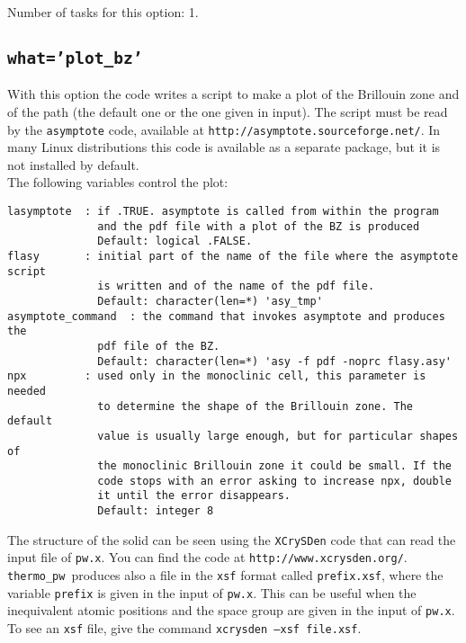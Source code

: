 \documentclass[12pt,a4paper]{article}
\def\thermo{\texttt{thermo\_pw}}
\begin{document}
Number of tasks for this option: 1.

\subsection{\color{web-blue}\texttt{what='plot\_bz'}}
With this option the code writes a script to make a plot
of the Brillouin zone and of the path (the default one or the one given in 
input). 
The script must be read by the \texttt{asymptote} code, available at 
\texttt{http://asymptote.sourceforge.net/}. In many Linux distributions
this code is available as a separate package, but it is not installed by
default. \\
The following variables control the plot:
\begin{verbatim}
lasymptote  : if .TRUE. asymptote is called from within the program
              and the pdf file with a plot of the BZ is produced
              Default: logical .FALSE.
flasy       : initial part of the name of the file where the asymptote script
              is written and of the name of the pdf file.
              Default: character(len=*) 'asy_tmp'
asymptote_command  : the command that invokes asymptote and produces the 
              pdf file of the BZ.
              Default: character(len=*) 'asy -f pdf -noprc flasy.asy'
npx         : used only in the monoclinic cell, this parameter is needed
              to determine the shape of the Brillouin zone. The default
              value is usually large enough, but for particular shapes of
              the monoclinic Brillouin zone it could be small. If the
              code stops with an error asking to increase npx, double 
              it until the error disappears.
              Default: integer 8
\end{verbatim}
The structure of the solid can be seen using the \texttt{XCrySDen} code
that can read the input file of \texttt{pw.x}. You can find the code at
\texttt{http://www.xcrysden.org/}. \thermo\ produces also a file in the
\texttt{xsf} format called \texttt{prefix.xsf}, where the variable 
\texttt{prefix}
is given in the input of \texttt{pw.x}. This can be useful when
the inequivalent atomic positions and the space group are given in the input
of \texttt{pw.x}. To see an \texttt{xsf} file, give the command
\texttt{xcrysden --xsf file.xsf}.
\end{document}
